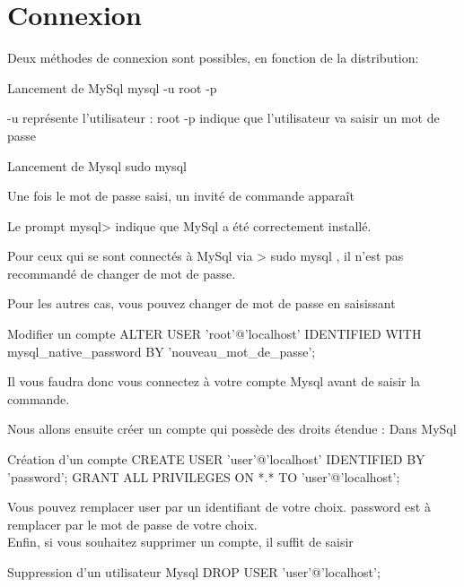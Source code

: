 \section{Connexion}

Deux méthodes de connexion sont possibles, en fonction de la distribution: 

\begin{Bash}{Lancement de MySql}
mysql -u root -p
\end{Bash}

-u 	représente l’utilisateur : root
-p 	indique que l’utilisateur va saisir un mot de passe

\begin{Bash}{Lancement de Mysql}
sudo mysql
\end{Bash}

Une fois le mot de passe saisi, un invité de commande apparaît

Le prompt mysql> indique que MySql a été correctement installé.

Pour ceux qui se sont connectés à MySql via > sudo mysql , il n’est pas recommandé de changer de mot de passe.

Pour les autres cas, vous pouvez changer de mot de passe en saisissant 
\begin{Bash}{Modifier un compte}
ALTER USER 'root'@'localhost' IDENTIFIED WITH mysql_native_password BY 'nouveau_mot_de_passe';
\end{Bash}

Il vous faudra donc vous connectez à votre compte Mysql avant de saisir la commande. 


Nous allons ensuite créer un compte qui possède des droits étendue :
Dans MySql \\


\begin{Bash}{Création d'un compte}
CREATE USER 'user'@'localhost' IDENTIFIED BY 'password';
GRANT ALL PRIVILEGES ON *.* TO 'user'@'localhost';
\end{Bash}


Vous pouvez remplacer user par un identifiant de votre choix.
password est à remplacer par le mot de passe de votre choix. \\

Enfin, si vous souhaitez supprimer un compte, il suffit de saisir
\begin{Bash}{Suppression d'un utilisateur Mysql}
DROP USER 'user'@'localhost';
\end{Bash}


